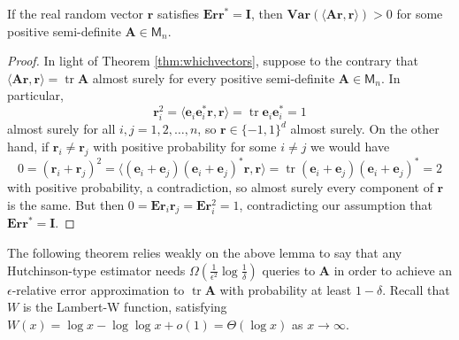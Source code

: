 \documentclass[10pt,letterpaper]{siamart171218}
\theoremstyle{definition}
\theoremstyle{remark}
\newcommand\inner[1]{\langle #1 \rangle}
\newcommand\M{\mathsf{M}}
\newcommand\E{\mathbf{E}}
\newcommand\Var{\mathbf{Var}}
\newcommand\tr{\operatorname{tr}}
\newcommand\A{\boldsymbol{A}}
\newcommand\I{\boldsymbol{I}}
\renewcommand\r{\boldsymbol{r}}
\newcommand\e{\boldsymbol{e}}
\begin{document}
\begin{lemma}
    If the real random vector $\r$ satisfies $\E\r\r^* = \I$, then $\Var(\inner{\A\r,\r})
    >0$ for some positive semi-definite $\A\in\M_n$.
\end{lemma}
\begin{proof}
    In light of Theorem \ref{thm:whichvectors},
    suppose to the contrary that $\inner{\A\r,\r} = \tr\A$ almost surely for
    every positive semi-definite $\A\in\M_n$. In particular,
    \[
        \r_i^2 = \inner{\e_i\e_i^*\r,\r} = \tr \e_i\e_i^* =1
    \]
    almost surely for all $i,j=1,2,\ldots,n$, so $\r\in\{-1,1\}^d$ almost surely.
    On the other hand, if $\r_i\neq \r_j$ with positive probability for some $i\neq j$
    we would have
    \[
        0 = (\r_i + \r_j)^2 = \inner{(\e_i+\e_j)(\e_i+\e_j)^*\r,\r} = \tr(\e_i+\e_j)(\e_i+\e_j)^* = 2
    \]
    with positive probability, a contradiction, so almost surely every component
    of $\r$ is the same. But then $0 = \E \r_i\r_j = \E \r_i^2 = 1$, contradicting
    our assumption that $\E\r\r^* = \I$.
\end{proof}

The following theorem relies weakly on the above lemma to say that any Hutchinson-type
estimator needs $\Omega(\tfrac{1}{\epsilon^2}\log\tfrac{1}{\delta})$ queries to $\A$
in order to achieve an $\epsilon$-relative error approximation to $\tr\A$ with
probability at least $1-\delta$. Recall that $W$ is the Lambert-W function,
satisfying $W(x) = \log x - \log\log x + o(1) = \Theta(\log x)$ as $x\to\infty$.
\citep{hoorfar2007approximation}
\end{document}
